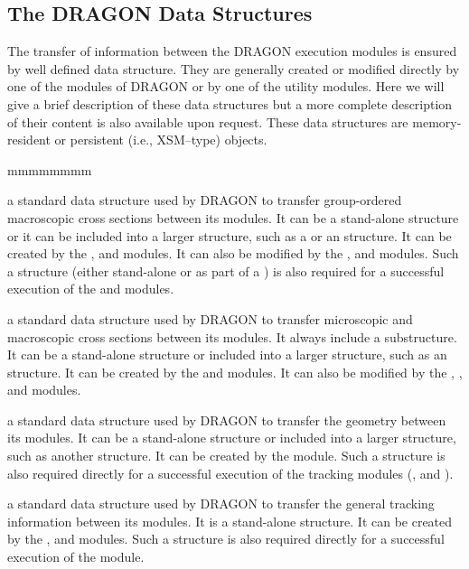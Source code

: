\subsection{The DRAGON Data Structures}\label{sect:DragonDataStructures}

The transfer of information between the DRAGON execution modules is
ensured by well defined data structure. They are generally created or
modified directly by one of the modules of DRAGON or by one of the utility
modules. Here we will give a brief description of these data structures but a
more complete description of their content is also available upon
request.\cite{DragonDataStructures} These data structures are memory-resident or
persistent (i.e., XSM--type) objects.

\begin{ListeDeDescription}{mmmmmmmm}

\item[\dds{macrolib}]  a standard data structure used by DRAGON to transfer
group-ordered macroscopic cross sections between its modules. It can be a
stand-alone structure or it can be included into a larger structure, such as a
 or an  structure. It can be created by the
,  and  modules. It can also be modified
by the ,  and  modules. Such a structure (either stand-alone
or as part of a ) is also required for a successful execution of the
 and  modules.

\item[\dds{microlib}] a standard data structure used by DRAGON to transfer
microscopic and macroscopic cross sections between its modules. It always
include a  substructure. It can be a stand-alone structure or
included into a larger structure, such as an  structure. It
can be created by the  and  modules. It can also be
modified by the , ,  and  modules. 

\item[\dds{geometry}] a standard data structure used by DRAGON to transfer
the geometry between its modules. It can be a stand-alone structure or
included into a larger structure, such as another  structure. It can be created by the  module. Such a structure is also
required directly for a successful execution of the tracking modules (,
 and ).

\item[\dds{tracking}] a standard data structure used by DRAGON to transfer
the general tracking information between its modules. It is a stand-alone
structure. It can be created by the ,  and 
modules. Such a structure is also required directly for a successful execution of
the  module.


\end{ListeDeDescription}
